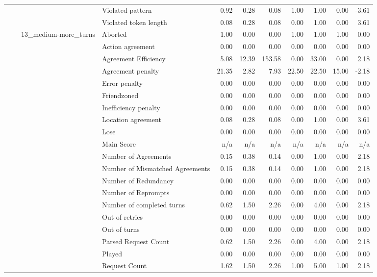 \begin{tabular}{llllrrrrrrr}
 &  &  & Violated pattern & 0.92 & 0.28 & 0.08 & 1.00 & 1.00 & 0.00 & -3.61 \\
 &  &  & Violated token length & 0.08 & 0.28 & 0.08 & 0.00 & 1.00 & 0.00 & 3.61 \\
\cline{3-11}
 &  & \multirow[t]{27}{*}{13_medium-more_turns} & Aborted & 1.00 & 0.00 & 0.00 & 1.00 & 1.00 & 1.00 & 0.00 \\
 &  &  & Action agreement & 0.00 & 0.00 & 0.00 & 0.00 & 0.00 & 0.00 & 0.00 \\
 &  &  & Agreement Efficiency & 5.08 & 12.39 & 153.58 & 0.00 & 33.00 & 0.00 & 2.18 \\
 &  &  & Agreement penalty & 21.35 & 2.82 & 7.93 & 22.50 & 22.50 & 15.00 & -2.18 \\
 &  &  & Error penalty & 0.00 & 0.00 & 0.00 & 0.00 & 0.00 & 0.00 & 0.00 \\
 &  &  & Friendzoned & 0.00 & 0.00 & 0.00 & 0.00 & 0.00 & 0.00 & 0.00 \\
 &  &  & Inefficiency penalty & 0.00 & 0.00 & 0.00 & 0.00 & 0.00 & 0.00 & 0.00 \\
 &  &  & Location agreement & 0.08 & 0.28 & 0.08 & 0.00 & 1.00 & 0.00 & 3.61 \\
 &  &  & Lose & 0.00 & 0.00 & 0.00 & 0.00 & 0.00 & 0.00 & 0.00 \\
 &  &  & Main Score & n/a & n/a & n/a & n/a & n/a & n/a & n/a \\
 &  &  & Number of Agreements & 0.15 & 0.38 & 0.14 & 0.00 & 1.00 & 0.00 & 2.18 \\
 &  &  & Number of Mismatched Agreements & 0.15 & 0.38 & 0.14 & 0.00 & 1.00 & 0.00 & 2.18 \\
 &  &  & Number of Redundancy & 0.00 & 0.00 & 0.00 & 0.00 & 0.00 & 0.00 & 0.00 \\
 &  &  & Number of Reprompts & 0.00 & 0.00 & 0.00 & 0.00 & 0.00 & 0.00 & 0.00 \\
 &  &  & Number of completed turns & 0.62 & 1.50 & 2.26 & 0.00 & 4.00 & 0.00 & 2.18 \\
 &  &  & Out of retries & 0.00 & 0.00 & 0.00 & 0.00 & 0.00 & 0.00 & 0.00 \\
 &  &  & Out of turns & 0.00 & 0.00 & 0.00 & 0.00 & 0.00 & 0.00 & 0.00 \\
 &  &  & Parsed Request Count & 0.62 & 1.50 & 2.26 & 0.00 & 4.00 & 0.00 & 2.18 \\
 &  &  & Played & 0.00 & 0.00 & 0.00 & 0.00 & 0.00 & 0.00 & 0.00 \\
 &  &  & Request Count & 1.62 & 1.50 & 2.26 & 1.00 & 5.00 & 1.00 & 2.18 \\

\end{tabular}
